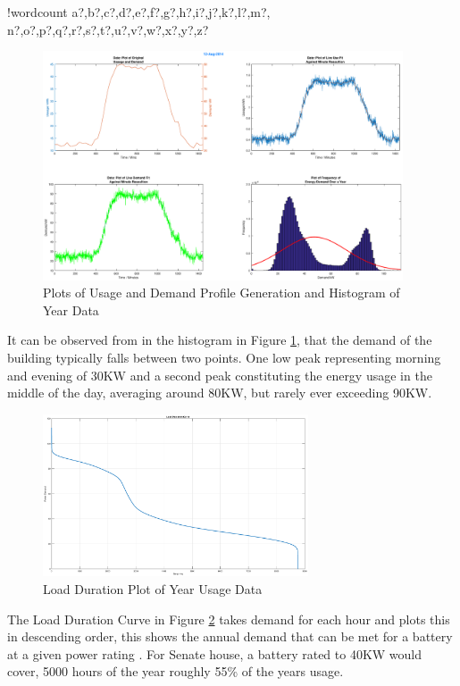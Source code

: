 \documentclass[fontsize=9.5pt]{extarticle}
\numberwithin{figure}{section} %
\newcounter{words}
\newenvironment{counted}{%
  \setcounter{words}{0}
  \SearchList!{wordcount}{\stepcounter{words}}
    {a?,b?,c?,d?,e?,f?,g?,h?,i?,j?,k?,l?,m?,
    n?,o?,p?,q?,r?,s?,t?,u?,v?,w?,x?,y?,z?}
  \UndoBoundary{'}
  \SearchOrder{p;}}{%
  \StopSearching}
\begin{document}
\begin{counted}
\begin{figure}[H]
 \centering
 \includegraphics[trim = 140 80 140 20, clip, width=0.95\textwidth]{Development-dd.eps}
 \caption{Plots of Usage and Demand Profile Generation and Histogram of Year Data}
 \label{Development-dd}
 \end{figure}

It can be observed from in the histogram in Figure \ref{Development-dd},
that the demand of the building typically falls between two points. One
low peak representing morning and evening of 30KW and a second peak
constituting the energy usage in the middle of the day, averaging around
80KW, but rarely ever exceeding 90KW.

\begin{figure}[H]
 \centering
 \includegraphics[trim = 0 0 0 0, clip, width=0.7\textwidth]{Development-a8.eps}
 \caption{Load Duration Plot of Year Usage Data}
 \label{Development-a8}
 \end{figure}

The Load Duration Curve in Figure \ref{Development-a8} takes demand for
each hour and plots this in descending order, this shows the annual
demand that can be met for a battery at a given power rating
\autocite{combined-heat-power-buildings}. For Senate house, a battery
rated to 40KW would cover, 5000 hours of the year roughly 55\% of the
years usage.


\end{counted}
\end{document}
